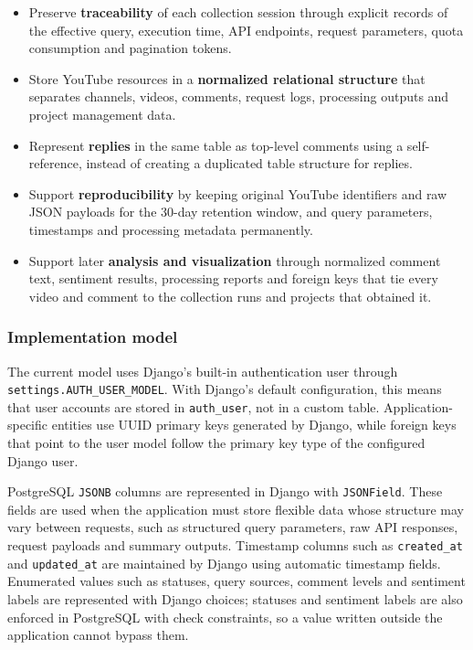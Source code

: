 \begin{itemize}
    \item Preserve \textbf{traceability} of each collection session through explicit records of the effective query, execution time, API endpoints, request parameters, quota consumption and pagination tokens.

    \item Store YouTube resources in a \textbf{normalized relational structure} that separates channels, videos, comments, request logs, processing outputs and project management data.

    \item Represent \textbf{replies} in the same table as top-level comments using a self-reference, instead of creating a duplicated table structure for replies.

    \item Support \textbf{reproducibility} by keeping original YouTube identifiers and raw JSON payloads for the 30-day retention window, and query parameters, timestamps and processing metadata permanently.

    \item Support later \textbf{analysis and visualization} through normalized comment text, sentiment results, processing reports and foreign keys that tie every video and comment to the collection runs and projects that obtained it.
\end{itemize}

\subsubsection{Implementation model}

The current model uses Django's built-in authentication user through \texttt{settings.\allowbreak AUTH\_\allowbreak USER\_\allowbreak MODEL}. With Django's default configuration, this means that user accounts are stored in \texttt{auth\_user}, not in a custom table. Application-specific entities use UUID primary keys generated by Django, while foreign keys that point to the user model follow the primary key type of the configured Django user.

PostgreSQL \texttt{JSONB} columns are represented in Django with \texttt{JSONField}. These fields are used when the application must store flexible data whose structure may vary between requests, such as structured query parameters, raw API responses, request payloads and summary outputs. Timestamp columns such as \texttt{created\_at} and \texttt{updated\_at} are maintained by Django using automatic timestamp fields. Enumerated values such as statuses, query sources, comment levels and sentiment labels are represented with Django choices; statuses and sentiment labels are also enforced in PostgreSQL with check constraints, so a value written outside the application cannot bypass them.

